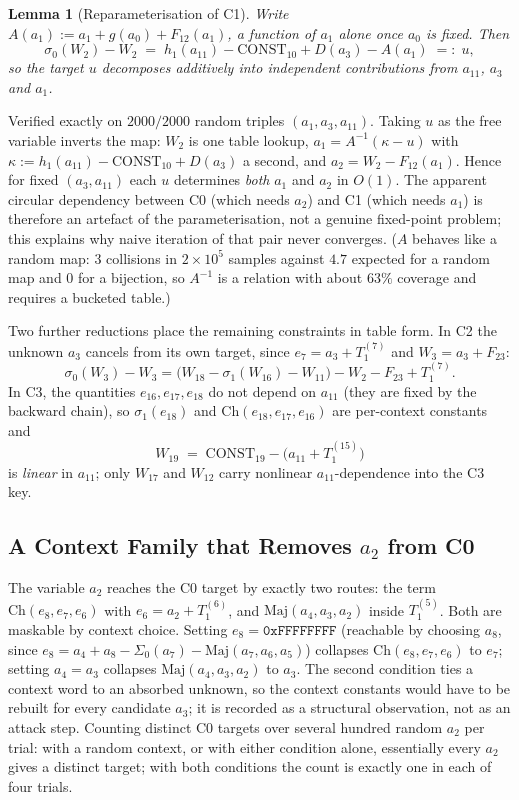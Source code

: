 \documentclass[11pt,a4paper]{article}
\newtheorem{lemma}{Lemma}
\newcommand{\Sig}[1]{\Sigma_{#1}}
\newcommand{\sig}[1]{\sigma_{#1}}
\newcommand{\Maj}{\mathrm{Maj}}
\newcommand{\Ch}{\mathrm{Ch}}
\begin{document}
\begin{lemma}[Reparameterisation of C1]
\label{lem:ureparam}
Write $A(a_1) := a_1 + g(a_0) + F_{12}(a_1)$, a function of $a_1$ alone once
$a_0$ is fixed.  Then
\[
  \sig{0}(W_2) - W_2 \;=\; h_1(a_{11}) - \mathrm{CONST}_{10} + D(a_3) - A(a_1)
  \;=:\; u ,
\]
so the target $u$ decomposes additively into independent contributions from
$a_{11}$, $a_3$ and $a_1$.
\end{lemma}

Verified exactly on $2000/2000$ random triples $(a_1,a_3,a_{11})$.  Taking $u$ as
the free variable inverts the map: $W_2$ is one table lookup,
$a_1 = A^{-1}(\kappa-u)$ with $\kappa := h_1(a_{11}) - \mathrm{CONST}_{10} +
D(a_3)$ a second, and $a_2 = W_2 - F_{12}(a_1)$.  Hence for fixed $(a_3,a_{11})$ each $u$
determines \emph{both} $a_1$ and $a_2$ in $O(1)$.  The apparent circular
dependency between C0 (which needs $a_2$) and C1 (which needs $a_1$) is therefore
an artefact of the parameterisation, not a genuine fixed-point problem; this
explains why naive iteration of that pair never converges.  ($A$ behaves
like a random map: $3$ collisions in $2\times10^{5}$ samples against $4.7$
expected for a random map and $0$ for a bijection, so $A^{-1}$ is a
relation with about $63\%$ coverage and requires a bucketed table.)

Two further reductions place the remaining constraints in table form.  In C2 the
unknown $a_3$ cancels from its own target, since $e_7 = a_3 + T_1^{(7)}$ and
$W_3 = a_3 + F_{23}$:
\[
  \sig{0}(W_3) - W_3 = \bigl(W_{18} - \sig{1}(W_{16}) - W_{11}\bigr) - W_2 - F_{23} + T_1^{(7)} .
\]
In C3, the quantities $e_{16},e_{17},e_{18}$ do not depend on $a_{11}$ (they are
fixed by the backward chain), so $\sig{1}(e_{18})$ and $\Ch(e_{18},e_{17},e_{16})$
are per-context constants and
\[
  W_{19} \;=\; \mathrm{CONST}_{19} - \bigl(a_{11} + T_1^{(15)}\bigr)
\]
is \emph{linear} in $a_{11}$; only $W_{17}$ and $W_{12}$ carry nonlinear
$a_{11}$-dependence into the C3 key.

\subsection{A Context Family that Removes \texorpdfstring{$a_2$}{a2} from C0}
\label{sec:a2free}

The variable $a_2$ reaches the C0 target by exactly two routes: the term
$\Ch(e_8,e_7,e_6)$ with $e_6 = a_2 + T_1^{(6)}$, and $\Maj(a_4,a_3,a_2)$
inside $T_1^{(5)}$.  Both are maskable by context choice.  Setting
$e_8 = \texttt{0xFFFFFFFF}$ (reachable by choosing $a_8$, since
$e_8 = a_4 + a_8 - \Sig{0}(a_7) - \Maj(a_7,a_6,a_5)$) collapses
$\Ch(e_8,e_7,e_6)$ to $e_7$; setting $a_4 = a_3$ collapses
$\Maj(a_4,a_3,a_2)$ to $a_3$.  The second condition ties a context word to
an absorbed unknown, so the context constants would have to be rebuilt for
every candidate $a_3$; it is recorded as a structural observation, not as
an attack step.  Counting distinct C0 targets over several hundred random
$a_2$ per trial: with a random context, or with either condition alone,
essentially every $a_2$ gives a distinct target; with both conditions the
count is exactly one in each of four trials.
\end{document}
